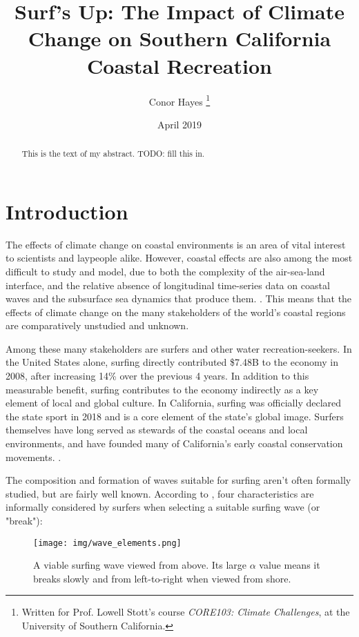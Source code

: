 \documentclass[12pt, letterpaper]{article}
\title{Surf's Up: The Impact of Climate Change on Southern California Coastal Recreation}
\author{Conor Hayes \thanks{Written for Prof. Lowell Stott's course \textit{CORE103: Climate Challenges}, at the University of Southern California.}}
\date{April 2019}
\begin{document}
	\maketitle

	\begin{abstract}
		This is the text of my abstract. TODO: fill this in.
	\end{abstract}

	\section{Introduction}
	The effects of climate change on coastal environments is an area of vital interest to scientists and laypeople alike. However, coastal effects are also among the most difficult to study and model, due to both the complexity of the air-sea-land interface, and the relative absence of longitudinal time-series data on coastal waves and the subsurface sea dynamics that produce them. \citep{swells-deep-water-waves}. This means that the effects of climate change on the many stakeholders of the world's coastal regions are comparatively unstudied and unknown. \citep{swells-deep-water-waves}

	Among these many stakeholders are surfers and other water recreation-seekers. In the United States alone, surfing directly contributed \$7.48B to the economy in 2008, after increasing 14\% over the previous 4 years. \citep{surfing-value-to-society} In addition to this measurable benefit, surfing contributes to the economy indirectly as a key element of local and global culture. In California, surfing was officially declared the state sport in 2018 \citep{surfing-official-sport} and is a core element of the state's global image. Surfers themselves have long served as stewards of the coastal oceans and local environments, and have founded many of California's early coastal conservation movements. \citep{surfing-official-sport}.

	The composition and formation of waves suitable for surfing aren't often formally studied, but are fairly well known. According to \citet{surfing-science}, four characteristics are informally considered by surfers when selecting a suitable surfing wave (or "break"): 

	\begin{figure}[h]
		\centering
		\texttt{[image: img/wave\_elements.png]}
		\caption{A viable surfing wave viewed from above. Its large $\alpha$ value means it breaks slowly and from left-to-right when viewed from shore.\citep{surfing-science}}
	\end{figure} 
\end{document}
